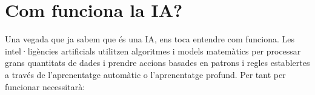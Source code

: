 \section{Com funciona la IA?}
Una vegada que ja sabem que és una IA, ens toca entendre com funciona.
Les intel·ligències artificials utilitzen algoritmes i models matemàtics per processar grans quantitats de dades
i prendre accions basades en patrons i regles establertes a través de l'aprenentatge automàtic o l'aprenentatge profund.
Per tant per funcionar necessitarà:

